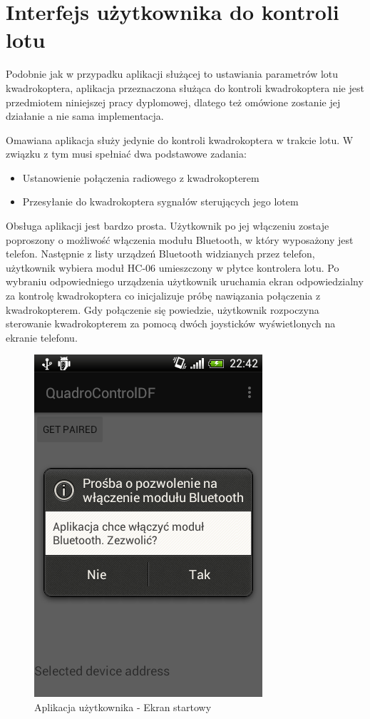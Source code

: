 \section{Interfejs użytkownika do kontroli lotu}

Podobnie jak w przypadku aplikacji służącej to ustawiania parametrów lotu kwadrokoptera, aplikacja przeznaczona służąca do kontroli kwadrokoptera nie jest przedmiotem niniejszej pracy dyplomowej, dlatego też omówione zostanie jej działanie a nie sama implementacja.

Omawiana aplikacja służy jedynie do kontroli kwadrokoptera w trakcie lotu. W związku z tym musi spełniać dwa podstawowe zadania:
\begin{itemize}
	\item Ustanowienie połączenia radiowego z kwadrokopterem
	\item Przesyłanie do kwadrokoptera sygnałów sterujących jego lotem
\end{itemize}

Obsługa aplikacji jest bardzo prosta. Użytkownik po jej włączeniu zostaje poproszony o możliwość włączenia modułu Bluetooth, w który wyposażony jest telefon. Następnie z listy urządzeń Bluetooth widzianych przez telefon, użytkownik wybiera moduł HC-06 umieszczony w płytce kontrolera lotu. Po wybraniu odpowiedniego urządzenia użytkownik uruchamia ekran odpowiedzialny za kontrolę kwadrokoptera co inicjalizuje próbę nawiązania połączenia z kwadrokopterem. Gdy połączenie się powiedzie, użytkownik rozpoczyna sterowanie kwadrokopterem za pomocą dwóch joysticków wyświetlonych na ekranie telefonu.

\begin{figure}[H]
	\centering
	\includegraphics[scale=0.6]{Pictures/DroidAtScreen/droid@screen-1.png}
	\caption[Aplikacja użytkownika - Ekran startory]{Aplikacja użytkownika - Ekran startowy}
	\label{fig:QuadroControl_screen1}
\end{figure}

